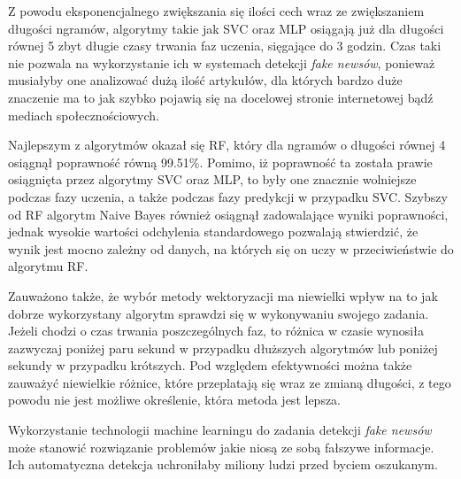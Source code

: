 Z powodu eksponencjalnego zwiększania się ilości cech wraz ze zwiększaniem długości ngramów, 
algorytmy takie jak SVC oraz MLP osiągają już dla długości równej 5 zbyt długie czasy trwania faz uczenia, sięgające 
do 3 godzin. Czas taki nie pozwala na wykorzystanie ich w systemach detekcji \textit{fake newsów}, ponieważ
musiałyby one analizować dużą ilość artykułów, dla których bardzo duże znaczenie ma to jak 
szybko pojawią się na docelowej stronie internetowej bądź mediach społecznościowych.

Najlepszym z algorytmów okazał się RF, który dla ngramów o długości równej 4
osiągnął poprawność równą 99.51\%. Pomimo, iż poprawność ta została prawie osiągnięta przez algorytmy
SVC oraz MLP, to były one znacznie wolniejsze podczas fazy uczenia, a także podczas fazy 
predykcji w przypadku SVC. Szybszy od RF algorytm Naive Bayes również osiągnął zadowalające wyniki poprawności,
jednak wysokie wartości odchylenia standardowego pozwalają stwierdzić, że wynik jest mocno zależny od 
danych, na których się on uczy w przeciwieństwie do algorytmu RF.

Zauważono także, że wybór metody wektoryzacji ma niewielki wpływ na to jak dobrze wykorzystany algorytm 
sprawdzi się w wykonywaniu swojego zadania. Jeżeli chodzi o czas trwania poszczególnych faz, to 
różnica w czasie wynosiła zazwyczaj poniżej paru sekund w przypadku dłuższych algorytmów lub poniżej 
sekundy w przypadku krótszych. Pod względem efektywności można także zauważyć niewielkie różnice,
które przeplatają się
wraz ze zmianą długości, z tego powodu nie jest możliwe określenie, która metoda jest lepsza.

Wykorzystanie technologii machine learningu do zadania detekcji \textit{fake newsów} 
może stanowić rozwiązanie problemów jakie niosą ze sobą fałszywe informacje. Ich automatyczna 
detekcja uchroniłaby miliony ludzi przed byciem oszukanym. 

